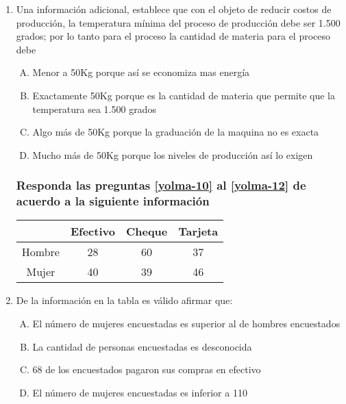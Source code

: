 \begin{enumerate}

\item Una información adicional, establece que con el objeto de reducir costos de producción, la temperatura mínima del proceso de producción debe ser 1.500 grados; por lo tanto para el proceso  la cantidad de materia para el proceso debe \label{yolma-9}\\

\begin{enumerate}[(A)]
\item  Menor a 50Kg porque así se economiza mas energía
\item Exactamente 50Kg porque es la cantidad de materia que permite que la temperatura sea 1.500 grados
\item Algo más de 50Kg porque la graduación de la maquina no es exacta
\item Mucho más de 50Kg porque los niveles de producción así lo exigen
\end{enumerate}


\subsubsection*{Responda las preguntas \ref{yolma-10} al \ref{yolma-12} de acuerdo a la siguiente información}

\begin{center}
\begin{tabular}{c|ccc}
\hline 
\hline 
 & Efectivo & Cheque & Tarjeta \\ 
\hline 
\hline 
Hombre & 28 & 60 & 37 \\ 
Mujer & 40 & 39 & 46 \\ 
\hline 
\hline 
\end{tabular} 
\end{center}
\item  De la información en la tabla es válido afirmar que: \label{yolma-10}\\

\begin{enumerate}[(A)]
\item  El número de mujeres encuestadas es superior al de hombres encuestados
\item La cantidad de personas encuestadas es desconocida
\item 68 de los encuestados pagaron sus compras en efectivo
\item El número de mujeres encuestadas es inferior a 110
\end{enumerate}


\end{enumerate}
